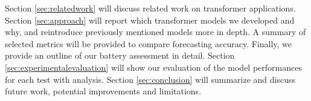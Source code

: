 Section \ref{sec:relatedwork} will discuss related work on transformer applications.
Section \ref{sec:approach}  will report which transformer models we developed and why,  and reintroduce previously mentioned models more in depth. A summary of selected metrics will be provided to compare forecasting accuracy. Finally, we provide an outline of our battery assessment in detail.
Section \ref{sec:experimentalevaluation} will show our evaluation of the model performances for each test with analysis.
Section \ref{sec:conclusion} will summarize and discuss future work, potential improvements and limitations.
